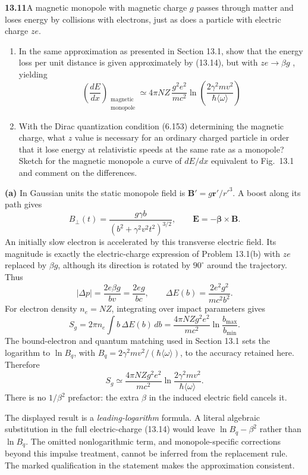 \par\bigskip
\noindent\textbf{13.11}\quad A magnetic monopole with magnetic charge $g$ passes through matter and loses energy by collisions with electrons, just as does a particle with electric charge $ze$.
\begin{enumerate}
\item[(a)] In the same approximation as presented in Section 13.1, show that the energy loss per unit distance is given approximately by (13.14), but with $ze\to\beta g$ , yielding
\[
\left(\frac{dE}{dx}\right)_{\substack{\mathrm{magnetic}\\ \mathrm{monopole}}}\simeq4\pi NZ\,\frac{g^{2}e^{2}}{mc^{2}}\ln\!\left(\frac{2\gamma^{2}mv^{2}}{\hbar\langle\omega\rangle}\right)
\]
\item[(b)] With the Dirac quantization condition (6.153) determining the magnetic charge, what $z$ value is necessary for an ordinary charged particle in order that it lose energy at relativistic speeds at the same rate as a monopole? Sketch for the magnetic monopole a curve of $dE/dx$ equivalent to Fig.~13.1 and comment on the differences.
\end{enumerate}
\solution
\textbf{(a)} In Gaussian units the static monopole field is
$\mathbf B'=g\mathbf r'/r'^3$. A boost along its path gives
\[
 B_\perp(t)=\frac{g\gamma b}{(b^2+\gamma^2v^2t^2)^{3/2}},
 \qquad \mathbf E=-\boldsymbol\beta\times\mathbf B.
\]
An initially slow electron is accelerated by this transverse electric
field. Its magnitude is exactly the electric-charge expression of
Problem 13.1(b) with $ze$ replaced by $\beta g$, although its direction
is rotated by $90^\circ$ around the trajectory. Thus
\[
 |\Delta p|=\frac{2e\beta g}{bv}
           =\frac{2eg}{bc},\qquad
 \Delta E(b)=\frac{2e^2g^2}{mc^2b^2}.
\]
For electron density $n_e=NZ$, integrating over impact parameters gives
\[
 S_g=2\pi n_e\int b\,\Delta E(b)\,db
 =\frac{4\pi NZg^2e^2}{mc^2}\ln\frac{b_{\max}}{b_{\min}}.
\]
The bound-electron and quantum matching used in Section 13.1 sets
the logarithm to $\ln B_q$, with
$B_q=2\gamma^2mv^2/(\hbar\langle\omega\rangle)$, to the accuracy
retained here. Therefore
\[
 \boxed{S_g\simeq\frac{4\pi NZg^2e^2}{mc^2}
 \ln\frac{2\gamma^2mv^2}{\hbar\langle\omega\rangle}.}
\]
There is no $1/\beta^2$ prefactor: the extra $\beta$ in the induced
electric field cancels it.

The displayed result is a \emph{leading-logarithm} formula.
A literal algebraic substitution in the full electric-charge (13.14)
would leave $\ln B_q-\beta^2$ rather than $\ln B_q$.
The omitted nonlogarithmic term, and monopole-specific corrections
beyond this impulse treatment, cannot be inferred from the replacement
rule. The marked qualification in the statement makes the approximation
consistent.

